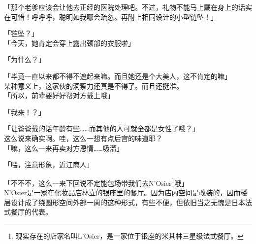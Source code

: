「那个老爹应该会让他去正经的医院处理吧。不过，礼物不能马上戴在身上的话实在可惜！呼呼呼，聪明如我哪会疏忽。再附上相同设计的小型链坠！」

「链坠？」\\

「今天，她肯定会穿上露出颈部的衣服啦」

「为什么？」

「毕竟一直以来都不得不遮起来嘛。而且她还是个大美人，这不肯定的嘛」\\

某种意义上，这家伙的洞察力还真是不得了。而且还挺准。\\

「所以，前辈要好好帮对方戴上哦」

「我来！？」

「让爸爸戴的话年龄有些……而其他的人可就全都是女性了哦？」\\

这么说来确实啊。哇，这么一想有点后宫的味道耶？\\

「嘛，这么一来再卖对方恩情……吸溜」

「喂，注意形象，近江商人」

「不不不，这么一来下回说不定能包场带我们去N’Osier\footnote{现实存在的店家名叫L’Osier，是一家位于银座的米其林三星级法式餐厅。}哦」\\

N’Osier是一家在化妆品店林立的银座里的餐厅。因为店内空间是改装的，因而楼层设计成了绕圆形空间外部一周的这种形式，有些不便，但依旧当之无愧是日本法式餐厅的代表。

